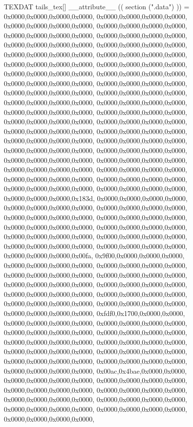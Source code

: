 TEXDAT tails_tex[] __attribute__ (( section (".data") )) = {
	0x0000,0x0000,0x0000,0x0000,
	0x0000,0x0000,0x0000,0x0000,
	0x0000,0x0000,0x0000,0x0000,
	0x0000,0x0000,0x0000,0x0000,
	0x0000,0x0000,0x0000,0x0000,
	0x0000,0x0000,0x0000,0x0000,
	0x0000,0x0000,0x0000,0x0000,
	0x0000,0x0000,0x0000,0x0000,
	0x0000,0x0000,0x0000,0x0000,
	0x0000,0x0000,0x0000,0x0000,
	0x0000,0x0000,0x0000,0x0000,
	0x0000,0x0000,0x0000,0x0000,
	0x0000,0x0000,0x0000,0x0000,
	0x0000,0x0000,0x0000,0x0000,
	0x0000,0x0000,0x0000,0x0000,
	0x0000,0x0000,0x0000,0x0000,
	0x0000,0x0000,0x0000,0x0000,
	0x0000,0x0000,0x0000,0x0000,
	0x0000,0x0000,0x0000,0x0000,
	0x0000,0x0000,0x0000,0x0000,
	0x0000,0x0000,0x0000,0x0000,
	0x0000,0x0000,0x0000,0x0000,
	0x0000,0x0000,0x0000,0x0000,
	0x0000,0x0000,0x0000,0x0000,
	0x0000,0x0000,0x0000,0x0000,
	0x0000,0x0000,0x0000,0x0000,
	0x0000,0x0000,0x0000,0x0000,
	0x0000,0x0000,0x0000,0x0000,
	0x0000,0x0000,0x0000,0x0000,
	0x0000,0x0000,0x0000,0x0000,
	0x0000,0x0000,0x0000,0x0000,
	0x0000,0x0000,0x0000,0x0000,
	0x0000,0x0000,0x0000,0x0000,
	0x0000,0x0000,0x0000,0x0000,
	0x0000,0x0000,0x0000,0x0000,
	0x0000,0x0000,0x0000,0x0000,
	0x0000,0x0000,0x0000,0x0000,
	0x0000,0x0000,0x0000,0x0000,
	0x0000,0x0000,0x0000,0x183d,
	0x0000,0x0000,0x0000,0x0000,
	0x0000,0x0000,0x0000,0x0000,
	0x0000,0x0000,0x0000,0x0000,
	0x0000,0x0000,0x0000,0x0000,
	0x0000,0x0000,0x0000,0x0000,
	0x0000,0x0000,0x0000,0x0000,
	0x0000,0x0000,0x0000,0x0000,
	0x0000,0x0000,0x0000,0x0000,
	0x0000,0x0000,0x0000,0x0000,
	0x0000,0x0000,0x0000,0x0000,
	0x0000,0x0000,0x0000,0x0000,
	0x0000,0x0000,0x0000,0x00fa,
	0x9f00,0x0000,0x0000,0x0000,
	0x0000,0x0000,0x0000,0x0000,
	0x0000,0x0000,0x0000,0x0000,
	0x0000,0x0000,0x0000,0x0000,
	0x0000,0x0000,0x0000,0x0000,
	0x0000,0x0000,0x0000,0x0000,
	0x0000,0x0000,0x0000,0x0000,
	0x0000,0x0000,0x0000,0x0000,
	0x0000,0x0000,0x0000,0x0000,
	0x0000,0x0000,0x0000,0x0000,
	0x0000,0x0000,0x0000,0x0000,
	0x0000,0x0000,0x0000,0x0000,
	0xfdf0,0x1700,0x0000,0x0000,
	0x0000,0x0000,0x0000,0x0000,
	0x0000,0x0000,0x0000,0x0000,
	0x0000,0x0000,0x0000,0x0000,
	0x0000,0x0000,0x0000,0x0000,
	0x0000,0x0000,0x0000,0x0000,
	0x0000,0x0000,0x0000,0x0000,
	0x0000,0x0000,0x0000,0x0000,
	0x0000,0x0000,0x0000,0x0000,
	0x0000,0x0000,0x0000,0x0000,
	0x0000,0x0000,0x0000,0x0000,
	0x0000,0x0000,0x0000,0x0000,
	0x00ac,0x4bae,0x0000,0x0000,
	0x0000,0x0000,0x0000,0x0000,
	0x0000,0x0000,0x0000,0x0000,
	0x0000,0x0000,0x0000,0x0000,
	0x0000,0x0000,0x0000,0x0000,
	0x0000,0x0000,0x0000,0x0000,
	0x0000,0x0000,0x0000,0x0000,
	0x0000,0x0000,0x0000,0x0000,
	0x0000,0x0000,0x0000,0x0000,
	0x0000,0x0000,0x0000,0x0000,
}
